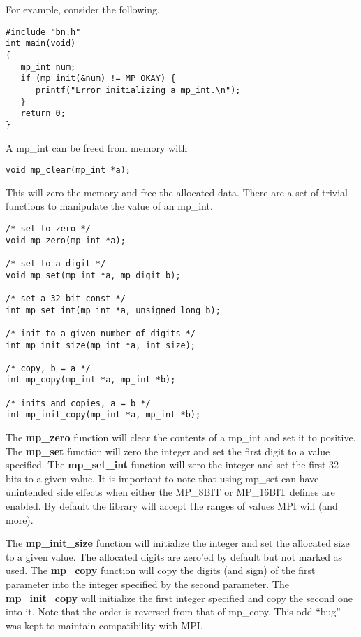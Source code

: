\documentclass{article}
\begin{document}
For example, consider the following.

\begin{verbatim}
#include "bn.h"
int main(void)
{
   mp_int num;
   if (mp_init(&num) != MP_OKAY) {
      printf("Error initializing a mp_int.\n");
   }
   return 0;
}   
\end{verbatim}

A mp\_int can be freed from memory with

\begin{verbatim}
void mp_clear(mp_int *a);
\end{verbatim}

This will zero the memory and free the allocated data.  There are a set of trivial functions to manipulate the 
value of an mp\_int.  

\begin{verbatim}
/* set to zero */
void mp_zero(mp_int *a);

/* set to a digit */
void mp_set(mp_int *a, mp_digit b);

/* set a 32-bit const */
int mp_set_int(mp_int *a, unsigned long b);

/* init to a given number of digits */
int mp_init_size(mp_int *a, int size);

/* copy, b = a */
int mp_copy(mp_int *a, mp_int *b);

/* inits and copies, a = b */
int mp_init_copy(mp_int *a, mp_int *b);
\end{verbatim}

The \textbf{mp\_zero} function will clear the contents of a mp\_int and set it to positive.  The \textbf{mp\_set} function 
will zero the integer and set the first digit to a value specified.  The \textbf{mp\_set\_int} function will zero the 
integer and set the first 32-bits to a given value.  It is important to note that using mp\_set can have unintended 
side effects when either the  MP\_8BIT or MP\_16BIT defines are enabled.  By default the library will accept the 
ranges of values MPI will (and more).

The \textbf{mp\_init\_size} function will initialize the integer and set the allocated size to a given value.  The 
allocated digits are zero'ed by default but not marked as used.  The \textbf{mp\_copy} function will copy the digits
(and sign) of the first parameter into the integer specified by the second parameter.  The \textbf{mp\_init\_copy} will
initialize the first integer specified and copy the second one into it.  Note that the order is reversed from that of
mp\_copy.  This odd ``bug'' was kept to maintain compatibility with MPI.
\end{document}
